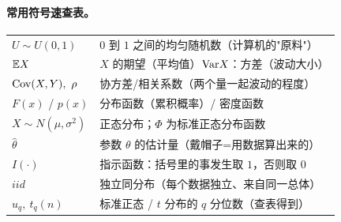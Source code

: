 \paragraph{常用符号速查表。}
\begin{center}
\begin{tabular}{ll}
$U\sim U(0,1)$ & $0$ 到 $1$ 之间的均匀随机数（计算机的"原料"）\\
$\mathbb{E} X$ & $X$ 的期望（平均值）\qquad $\mathrm{Var} X$：方差（波动大小）\\
$\Cov(X,Y),\ \rho$ & 协方差/相关系数（两个量一起波动的程度）\\
$F(x)$ / $p(x)$ & 分布函数（累积概率）/ 密度函数\\
$X\sim N(\mu,\sigma^2)$ & 正态分布；$\Phi$ 为标准正态分布函数\\
$\hat\theta$ & 参数 $\theta$ 的估计量（戴帽子=用数据算出来的）\\
$I(\cdot)$ & 指示函数：括号里的事发生取 $1$，否则取 $0$\\
$iid$ & 独立同分布（每个数据独立、来自同一总体）\\
$u_{q},\ t_q(n)$ & 标准正态 / $t$ 分布的 $q$ 分位数（查表得到）\\
\end{tabular}
\end{center}

\newpage
